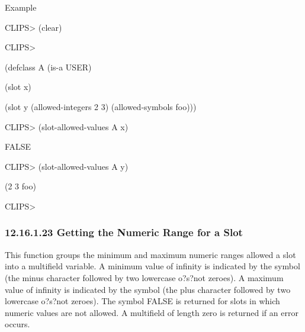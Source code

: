 \documentclass[letterpaper,10pt,english]{sphinxmanual}
\begin{document}

\begin{sphinxVerbatim}[commandchars=\\\{\}]
  
\end{sphinxVerbatim}

Example

CLIPS\textgreater{} (clear)

CLIPS\textgreater{}

(defclass A (is-a USER)

(slot x)

(slot y (allowed-integers 2 3) (allowed-symbols foo)))

CLIPS\textgreater{} (slot-allowed-values A x)

FALSE

CLIPS\textgreater{} (slot-allowed-values A y)

(2 3 foo)

CLIPS\textgreater{}


\subsubsection{12.16.1.23 Getting the Numeric Range for a Slot}
\label{\detokenize{actions:getting-the-numeric-range-for-a-slot}}
This function groups the minimum and maximum numeric ranges allowed a
slot into a multifield variable. A minimum value of infinity is
indicated by the symbol  (the minus character followed by two
lowercase o?s?not zeroes). A maximum value of infinity is indicated by
the symbol  (the plus character followed by two lowercase o?s?not
zeroes). The symbol FALSE is returned for slots in which numeric values
are not allowed. A multifield of length zero is returned if an error
occurs.


\begin{sphinxVerbatim}[commandchars=\\\{\}]
  
\end{sphinxVerbatim}
\end{document}
